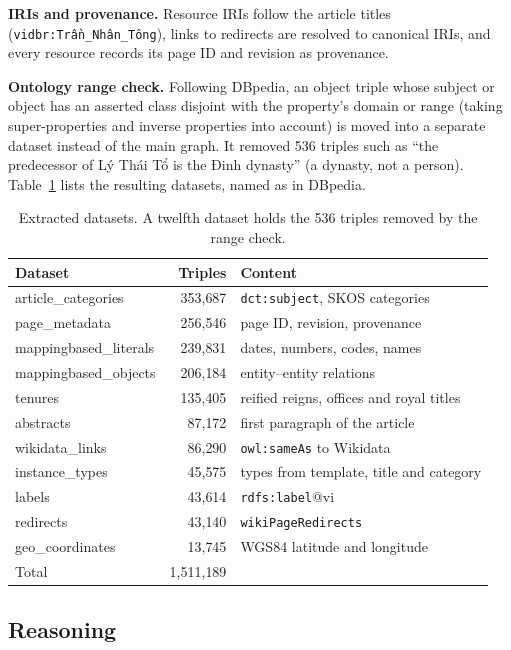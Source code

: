 \documentclass{article}
\newcommand{\ttl}[1]{\texttt{#1}}          %
\begin{document}
\textbf{IRIs and provenance.} Resource IRIs follow the article titles (\ttl{vidbr:Trần\_Nhân\_Tông}), links to
redirects are resolved to canonical IRIs, and every resource records its page ID and revision as provenance.

\textbf{Ontology range check.} Following DBpedia, an object triple whose subject or object has an asserted class
disjoint with the property's domain or range (taking super-properties and inverse properties into account) is moved
into a separate dataset instead of the main graph. It removed 536 triples such as ``the predecessor of Lý Thái Tổ is the
Đinh dynasty'' (a dynasty, not a person). Table~\ref{tab:datasets} lists the resulting datasets, named as in DBpedia.

\begin{table}[t]
  \caption{Extracted datasets. A twelfth dataset holds the 536 triples removed by the range check.}
  \label{tab:datasets}
  \centering\footnotesize
  \begin{tabular}{@{}l r l@{}}
    \toprule
    Dataset & Triples & Content\\
    \midrule
    article\_categories & 353{,}687 & \ttl{dct:subject}, SKOS categories\\
    page\_metadata & 256{,}546 & page ID, revision, provenance\\
    mappingbased\_literals & 239{,}831 & dates, numbers, codes, names\\
    mappingbased\_objects & 206{,}184 & entity--entity relations\\
    tenures & 135{,}405 & reified reigns, offices and royal titles\\
    abstracts & 87{,}172 & first paragraph of the article\\
    wikidata\_links & 86{,}290 & \ttl{owl:sameAs} to Wikidata\\
    instance\_types & 45{,}575 & types from template, title and category\\
    labels & 43{,}614 & \ttl{rdfs:label}@vi\\
    redirects & 43{,}140 & \ttl{wikiPageRedirects}\\
    geo\_coordinates & 13{,}745 & WGS84 latitude and longitude\\
    \midrule
    Total & 1{,}511{,}189 & \\
    \bottomrule
  \end{tabular}
\end{table}

\subsection{Reasoning}\label{sec:reason}
\end{document}
